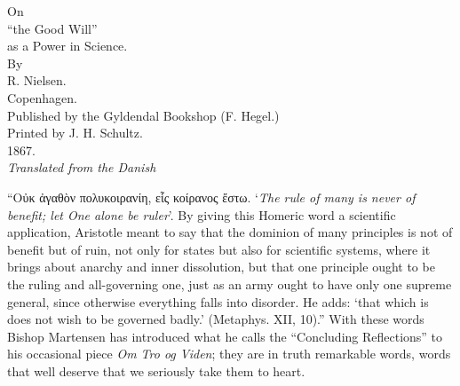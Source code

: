 \documentclass[12pt]{book}
\newcommand{\opage}[1]{\marginnote{\footnotesize\textit{[#1]}}}
\begin{document}
\frontmatter
\begin{titlepage}
\centering
\vspace*{3cm}
{\LARGE On}\\[1.5em]
{\Huge ``the Good Will''}\\[1.5em]
{\LARGE as a Power in Science.}\\[2em]
{\small By}\\[1em]
{\large R. Nielsen.}\\[5em]
Copenhagen.\\[0.5em]
Published by the Gyldendal Bookshop (F. Hegel.)\\[0.3em]
{\footnotesize Printed by J. H. Schultz.}\\[0.5em]
1867.\\[4em]
{\small\itshape Translated from the Danish}
\end{titlepage}

\tableofcontents

\mainmatter
{}

\opage{1}\setcounter{footnote}{0}%
``Οὐκ ἀγαθὸν πολυκοιρανίη, εἷς κοίρανος ἔστω.
`\emph{The rule of many is never of benefit; let One alone be ruler}'. By giving this Homeric word a scientific application, Aristotle meant to say that the dominion of many principles is not of benefit but of ruin, not only for states but also for scientific systems, where it brings about anarchy and inner dissolution, but that one principle ought to be the ruling and all-governing one, just as an army ought to have only one supreme general, since otherwise everything falls into disorder. He adds: `that which is does not wish to be governed badly.' (Metaphys. XII, 10).'' With these words Bishop Martensen has introduced what he calls the ``Concluding Reflections'' to his occasional piece \emph{Om Tro og Viden}; they are in truth remarkable words, words that well deserve that we seriously take them to heart.
\end{document}

